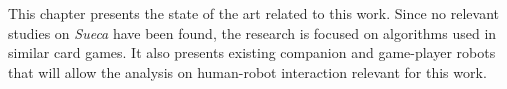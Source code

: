 \label{chapter:related-work}

This chapter presents the state of the art related to this work.
Since no relevant studies on \emph{Sueca} have been found, the research is focused on algorithms used in similar card games.
It also presents existing companion and game-player robots that will allow the analysis on human-robot interaction relevant for this work.





\cleardoublepage